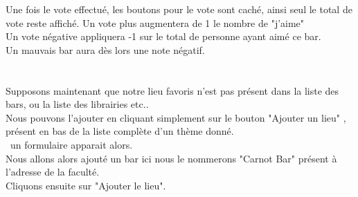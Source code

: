 \documentclass[10pt,a4paper, landscape]{report}
\begin{document}
{{{{{{\newpage
Une fois le vote effectué, les boutons pour le vote sont caché, ainsi seul le total de vote reste affiché.
Un vote plus augmentera de 1 le nombre de "j'aime" \\
Un vote négative appliquera -1 sur le total de personne ayant aimé ce bar. \\

Un mauvais bar aura dès lors une note négatif. \\
{%
\setlength{\fboxsep}{0pt}%
\setlength{\fboxrule}{2pt}%
%

\newpage
\section{}

Supposons maintenant que notre lieu favoris n'est pas présent dans la liste des bars, ou la liste des librairies etc.. \\
Nous pouvons l'ajouter en cliquant simplement sur le bouton "Ajouter un lieu" , présent en bas de la liste complète d'un thème donné. \\\
un formulaire apparait alors. \\

Nous allons alors ajouté un bar ici nous le nommerons "Carnot Bar" présent à l'adresse de la faculté. \\
Cliquons ensuite sur "Ajouter le lieu".
{%
\setlength{\fboxsep}{0pt}%
\setlength{\fboxrule}{2pt}%
%

}}}}}}}}
\end{document}
